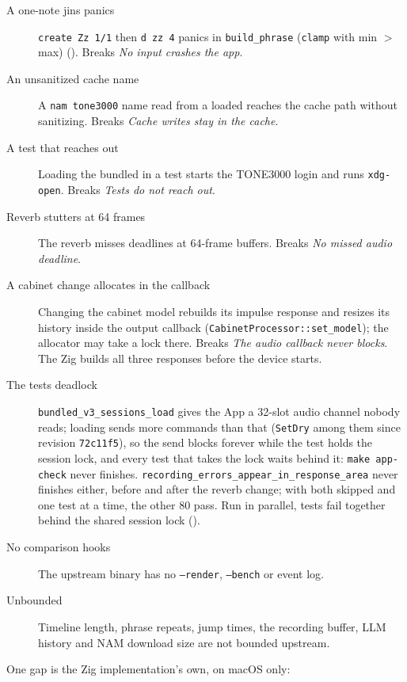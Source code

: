 \documentclass[11pt,oneside]{book}
\newcommand{\cmd}[1]{\texttt{#1}}
\begin{document}
\begin{description}
  \item[A one-note jins panics] \cmd{create Zz 1/1} then \cmd{d zz 4} panics in
  \texttt{build\_phrase} (\texttt{clamp} with min $>$ max)
  (). Breaks
  \emph{No input crashes the app}.
  \item[An unsanitized cache name] A \cmd{nam tone3000} name read from a loaded
   reaches the cache path without sanitizing. Breaks \emph{Cache
  writes stay in the cache}.
  \item[A test that reaches out] Loading the bundled  in a test
  starts the TONE3000 login and runs \texttt{xdg-open}. Breaks \emph{Tests do
  not reach out}.
  \item[Reverb stutters at 64 frames] The reverb misses deadlines at 64-frame
  buffers. Breaks \emph{No missed audio deadline}.
  \item[A cabinet change allocates in the callback] Changing the cabinet model
  rebuilds its impulse response and resizes its history inside the output
  callback (\texttt{CabinetProcessor::set\_model}); the allocator may take a
  lock there. Breaks \emph{The audio callback never blocks}. The Zig builds all
  three responses before the device starts.
  \item[The tests deadlock] \texttt{bundled\_v3\_sessions\_load} gives the App a
  32-slot audio channel nobody reads; loading  sends more
  commands than that (\texttt{SetDry} among them since revision
  \texttt{72c11f5}), so the send blocks forever while the test holds the
  session lock, and every test that takes the lock waits behind it:
  \cmd{make app-check} never finishes. \texttt{recording\_errors\_appear\_in\_response\_area}
  never finishes either, before and after the reverb change; with both skipped
  and one test at a time, the other 80 pass. Run in parallel, tests fail
  together behind the shared session lock
  ().
  \item[No comparison hooks] The upstream binary has no \cmd{--render},
  \cmd{--bench} or event log.
  \item[Unbounded] Timeline length, phrase repeats, jump times, the recording
  buffer, LLM history and NAM download size are not bounded upstream.
\end{description}

\noindent One gap is the Zig implementation's own, on macOS only:
\end{document}
